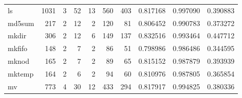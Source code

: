 \begin{tabular}{lrrrrrrrrr}
ls        &                   1031 &                                  3 &                                52 &                               13 &                               560 &                             403 &                                0.817168 &                               0.997090 &                             0.390883 \\
md5sum    &                    217 &                                  2 &                                12 &                                2 &                               120 &                              81 &                                0.806452 &                               0.990783 &                             0.373272 \\
mkdir     &                    306 &                                  2 &                                12 &                                6 &                               149 &                             137 &                                0.832516 &                               0.993464 &                             0.447712 \\
mkfifo    &                    148 &                                  2 &                                 7 &                                2 &                                86 &                              51 &                                0.798986 &                               0.986486 &                             0.344595 \\
mknod     &                    165 &                                  2 &                                 7 &                                2 &                                89 &                              65 &                                0.815152 &                               0.987879 &                             0.393939 \\
mktemp    &                    164 &                                  2 &                                 6 &                                2 &                                94 &                              60 &                                0.810976 &                               0.987805 &                             0.365854 \\
mv        &                    773 &                                  4 &                                30 &                               12 &                               433 &                             294 &                                0.817917 &                               0.994825 &                             0.380336 \\

\end{tabular}
